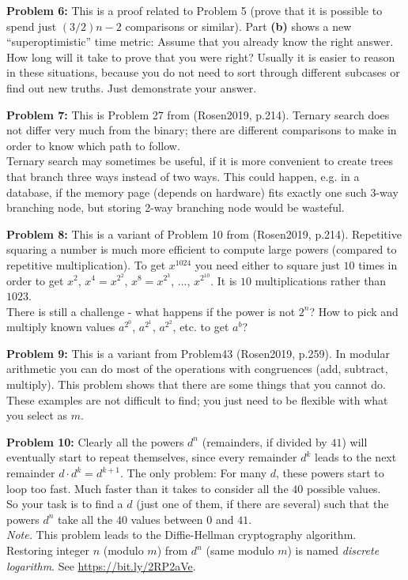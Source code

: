 \documentclass[jou]{apa6}
\begin{document}
\vspace{2ex}
{\bf Problem 6:}
This is a proof related to Problem 5 (prove that it is possible to spend just $(3/2)n - 2$ comparisons or similar). 
Part {\bf (b)} shows a new ``superoptimistic'' time metric: Assume that you already know the right answer. 
How long will it take to prove that you were right? Usually it is easier to reason in these situations, 
because you do not need to sort through different subcases or find out new truths. Just demonstrate your answer.

\vspace{2ex}
{\bf Problem 7:} 
This is Problem 27 from (Rosen2019, p.214). Ternary search does not differ very much from the binary; 
there are different comparisons to make in order to know which path to follow.\\
Ternary search may sometimes be useful, if it is more convenient to create trees that 
branch three ways instead of two ways. This could happen, e.g. in a database, if the memory 
page (depends on hardware) fits exactly one such 3-way branching node, but storing 2-way branching node
would be wasteful.

\vspace{2ex}
{\bf Problem 8:} 
This is a variant of Problem 10 from (Rosen2019, p.214). 
Repetitive squaring a number is much more efficient to compute large powers (compared 
to repetitive multiplication). To get $x^{1024}$ you need either to square just $10$ times
in order to get $x^2$, $x^4 = x^{2^2}$, $x^8 = x^{2^3}$, $\ldots$, $x^{2^{10}}$. 
It is $10$ multiplications rather than $1023$.\\
There is still a challenge - what happens if the power is not $2^n$? How to pick and multiply
known values $a^{2^0}$, $a^{2^1}$, $a^{2^2}$, etc. to get $a^b$?

\vspace{2ex}
{\bf Problem 9:} This is a variant from Problem43 (Rosen2019, p.259). 
In modular arithmetic you can do most of the operations with congruences (add, subtract, multiply). 
This problem shows that there are some things that you cannot do. 
These examples are not difficult to find; you just need to be flexible with what you select as $m$.


\vspace{2ex}
{\bf Problem 10:} Clearly all the powers $d^n$ (remainders, if divided by $41$) will 
eventually start to repeat themselves, since every remainder $d^k$ leads to the next
remainder $d \cdot d^k = d^{k+1}$. The only problem: For many $d$, these powers start
to loop too fast. Much faster than it takes to consider all the $40$ possible values.\\
So your task is to find a $d$ (just one of them, if there are several) such that 
the powers $d^n$ take all the $40$ values between $0$ and $41$.\\
{\em Note.} This problem leads to the Diffie-Hellman cryptography algorithm. 
Restoring integer $n$ (modulo $m$) from $d^n$ (same modulo $m$) is named 
{\em discrete logarithm}. See \url{https://bit.ly/2RP2aVe}. 
\end{document}
